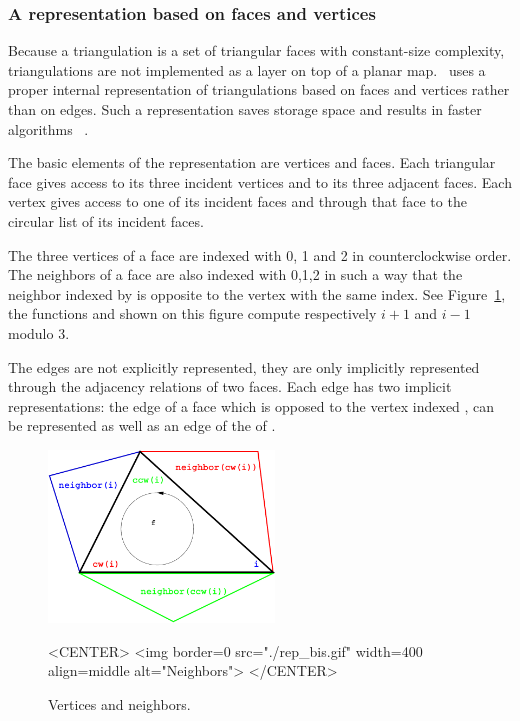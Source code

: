 \subsubsection{ A representation based on faces and vertices}
Because a triangulation is  a set of
triangular faces with constant-size complexity,
triangulations are not implemented
as a layer on top of a planar map.
\cgal\ uses a proper internal
representation of triangulations based on faces and vertices
rather than on edges. Such a  representation
saves storage space and results in faster
algorithms~ \cite{bdty-tcgal-00}.

The basic elements of the representation are vertices and faces.
Each triangular face gives access to its three incident vertices 
and to its three adjacent faces. 
Each vertex gives access to one of its incident faces
and through that face to the circular list of its incident faces.

The three vertices of a face are indexed with 0, 1 and 2
in counterclockwise order. The neighbors of a face are also 
indexed with 0,1,2 in such a way that the neighbor indexed by 
is opposite to the vertex with the same index.
See Figure~\ref{2D_Triangulation_Fig_neighbors1}, 
 the functions 
and  shown  on this figure
compute respectively $i+1$ and $i-1$ modulo 3.

The edges are not explicitly represented, they are only implicitly
represented through the adjacency relations of two faces.
Each edge has two implicit representations: the edge
of a face   which is opposed to the vertex indexed ,
can be represented as well as an edge of the  of 
. 


 \begin{figure}
\begin{ccTexOnly}
    \begin{center}
     \includegraphics[width=6cm]{Triangulation_2/rep_bis} 
    \end{center}
\end{ccTexOnly} 
  \begin{ccHtmlOnly}
<CENTER>
<img border=0  src="./rep_bis.gif" width=400 align=middle alt="Neighbors">
</CENTER>
\end{ccHtmlOnly} 

    \caption{Vertices and neighbors. 
    \label{2D_Triangulation_Fig_neighbors1} }
\end{figure}



